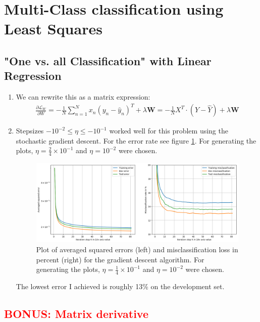 \documentclass[12pt]{article}
\begin{document}
\newpage\phantom{blabla}
\newpage\phantom{blabla}

\section{Multi-Class classification using Least Squares}

\subsection{"One vs. all Classification" with Linear Regression}

\begin{enumerate}
	\item We can rewrite this as a matrix expression:
	\begin{align*}
	\frac{\partial \mathcal{L}_W}{\partial W} = -\frac{1}{N} \sum_{n=1}^{N} x_n\left(  y_n - \hat{y}_n \right)^T + \lambda \textbf{W} = - \frac{1}{N} X^T \cdot \left( Y - \hat{Y} \right) + \lambda \textbf{W}
	\end{align*}
	\item Stepsizes $ -10^{-2} \leq \eta \le -10^{-1} $ worked well for this problem using the stochastic gradient descent. For the error rate see figure \ref{fig:3.1}. For generating the plots, $\eta = \frac{2}{4}\times 10^{-1}$ and $\eta=10^{-2}$ were chosen.
	\begin{figure}[h!]
		\centering
		\includegraphics[width=\linewidth]{./Problem_3/Problem_3.1.png}
		\caption{Plot of averaged squared errors (left) and misclassification loss in percent (right) for the gradient descent algorithm. For generating the plots, $\eta = \frac{1}{4}\times 10^{-1}$ and $\eta=10^{-2}$ were chosen.}
		\label{fig:3.1}
	\end{figure}
	The lowest error I achieved is roughly 13\% on the development set.
\end{enumerate}

\subsection{\textcolor{red}{BONUS: Matrix derivative}}
\end{document}
